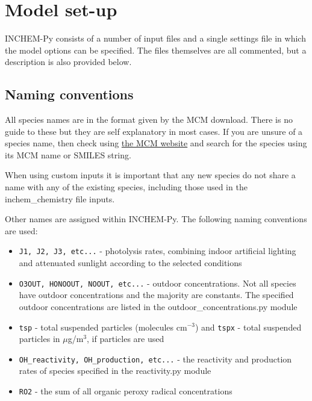 \documentclass[a4paper]{refart}
\begin{document}
\newpage
\section{Model set-up}
INCHEM-Py consists of a number of input files and a single settings file in which the model options can be specified. The files themselves are all commented, but a description is also provided below.

\subsection{Naming conventions}\label{Naming conventions}
All species names are in the format given by the MCM download. There is no guide to these but they are self explanatory in most cases. If you are unsure of a species name, then check using \href{mcm.york.ac.uk}{the MCM website} and search for the species using its MCM name or SMILES string.

When using custom inputs it is important that any new species do not share a name with any of the existing species, including those used in the inchem\_chemistry file inputs.

Other names are assigned within INCHEM-Py. The following naming conventions are used:
\begin{itemize}
    \item \texttt{J1, J2, J3, etc...} - photolysis rates, combining indoor artificial lighting and attenuated sunlight according to the selected conditions 
    \item \texttt{O3OUT, HONOOUT, NOOUT, etc...} - outdoor concentrations. Not all species have outdoor concentrations and the majority are constants. The specified outdoor concentrations are listed in the outdoor\_concentrations.py module
    \item \texttt{tsp} - total suspended particles (molecules cm$^{-3}$) and \texttt{tspx} - total suspended particles in $\mu$g/m$^3$, if particles are used 
    \item \texttt{OH\_reactivity, OH\_production, etc...} - the reactivity and production rates of species specified in the reactivity.py module 
    \item \texttt{RO2} - the sum of all organic peroxy radical concentrations
\end{itemize}
\end{document}
